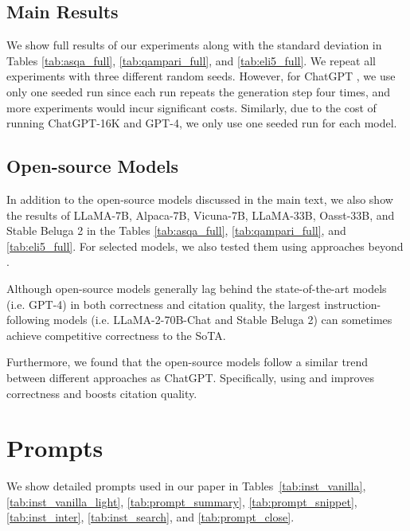 \subsection{Main Results}
\label{app_sec:more_main}
We show full results of our experiments along with the standard deviation 
in Tables \ref{tab:asqa_full}, \ref{tab:qampari_full}, and \ref{tab:eli5_full}.
We repeat all experiments with three different random seeds. 
However, for ChatGPT \rerank, we use only one seeded run since each run repeats the generation step four times, and more experiments would incur significant costs. Similarly, due to the cost of running ChatGPT-16K and GPT-4, we only use one seeded run for each model. 

\subsection{Open-source Models}
\label{app_sec:open-source-models}
In addition to the open-source models discussed in the main text, we also show the results of LLaMA-7B, Alpaca-7B, Vicuna-7B, LLaMA-33B, Oasst-33B, and Stable Beluga 2 in the Tables \ref{tab:asqa_full}, \ref{tab:qampari_full}, and \ref{tab:eli5_full}.
For selected models, we also tested them using approaches beyond \vani{}. 

Although open-source models generally lag behind the state-of-the-art models (i.e. GPT-4) in both correctness and citation quality, the largest instruction-following models (i.e. LLaMA-2-70B-Chat and Stable Beluga 2) can sometimes achieve competitive correctness to the SoTA. 

Furthermore, we found that the open-source models follow a similar trend between different approaches as ChatGPT. Specifically, using \summ{} and \snippet{} improves correctness and \rerank{} boosts citation quality. 








\section{Prompts}
\label{app_sec:propmt}

We show detailed prompts used in our paper in Tables~\ref{tab:inst_vanilla}, \ref{tab:inst_vanilla_light}, \ref{tab:prompt_summary}, \ref{tab:prompt_snippet}, \ref{tab:inst_inter}, \ref{tab:inst_search}, and \ref{tab:prompt_close}.

